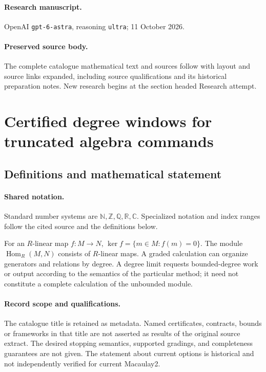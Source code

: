 \documentclass[11pt]{article}
\begin{document}
\paragraph{Research manuscript.} OpenAI \texttt{gpt-6-astra}, reasoning \texttt{ultra}; 11 October 2026.
\paragraph{Preserved source body.} The complete catalogue mathematical text and sources follow with layout and source links expanded, including source qualifications and its historical preparation notes. New research begins at the section headed Research attempt.

\section{Certified degree windows for truncated algebra commands}\label{statement}

\subsection{Definitions and mathematical statement}

\paragraph{Shared notation.}Standard number systems are $\mathbb N,\mathbb Z,\mathbb Q,\mathbb R,\mathbb C$. Specialized notation and index ranges follow the cited source and the definitions below.


For an $R$-linear map $f:M\to N$, $\ker f=\{m\in M:f(m)=0\}$. The module $\operatorname{Hom}_R(M,N)$ consists of $R$-linear maps. A graded calculation can organize generators and relations by degree. A degree limit requests bounded-degree work or output according to the semantics of the particular method; it need not constitute a complete calculation of the unbounded module.
\paragraph{Record scope and qualifications.}
The catalogue title is retained as metadata. Named certificates, contracts, bounds or frameworks in that title are not asserted as results of the original source extract.
The desired stopping semantics, supported gradings, and completeness guarantees are not given. The statement about current options is historical and not independently verified for current Macaulay2.
\end{document}
